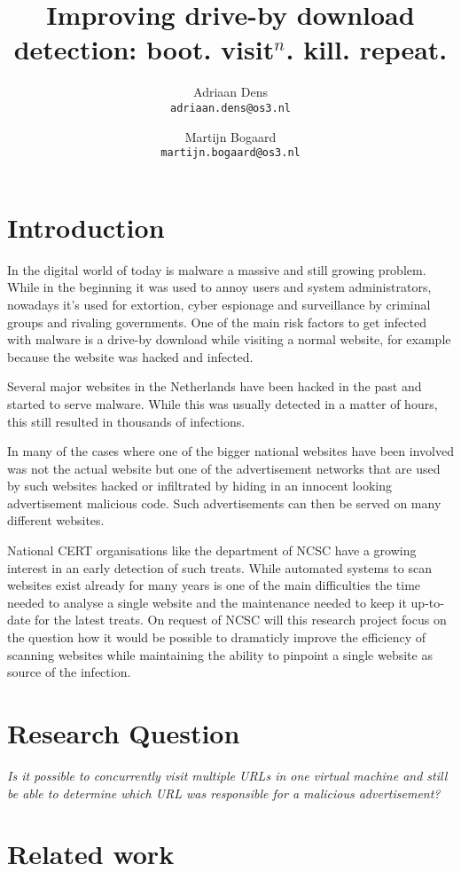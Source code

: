\documentclass{scrartcl}
\title{Improving drive-by download detection: boot. visit$^n$. kill. repeat.}
\author{
  Adriaan Dens\\
   \texttt{adriaan.dens@os3.nl}
  \and
  Martijn Bogaard\\
   \texttt{martijn.bogaard@os3.nl}
}
\begin{document}
\maketitle
\newpage

\section{Introduction}

In the digital world of today is malware a massive and still growing problem. While in the beginning it was used to annoy users and system administrators, nowadays it's used for extortion, cyber espionage and surveillance by criminal groups and rivaling governments. One of the main risk factors to get infected with malware is a drive-by download while visiting a normal website, for example because the website was hacked and infected. 

Several major websites in the Netherlands have been hacked in the past and started to serve malware. While this was usually detected in a matter of hours, this still resulted in thousands of infections.

In many of the cases where one of the bigger national websites have been involved was not the actual website but one of the advertisement networks that are used by such websites hacked or infiltrated by hiding in an innocent looking advertisement malicious code. Such advertisements can then be served on many different websites.

National CERT organisations like the department of NCSC have a growing interest in an early detection of such treats. While automated systems to scan websites exist already for many years is one of the main difficulties the time needed to analyse a single website and the maintenance needed to keep it up-to-date for the latest treats. On request of NCSC will this research project focus on the question how it would be possible to dramaticly improve the efficiency of scanning websites while maintaining the ability to pinpoint a single website as source of the infection.

\section{Research Question}

\textit{Is it possible to concurrently visit multiple URLs in one virtual machine and still be able to determine which URL was responsible for a malicious advertisement?}
\\
\section{Related work}
\end{document}
